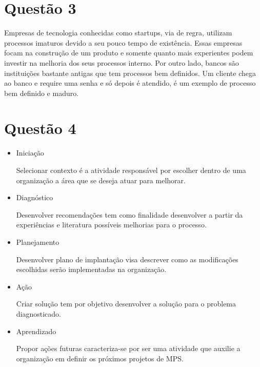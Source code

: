 \section{Questão 3}
    Empresas de tecnologia conhecidas como startups, via de regra, utilizam
processos imaturos devido a seu pouco tempo de existência. Essas empresas
focam na construção de um produto e somente quanto mais experientes podem
investir na melhoria dos seus processos interno. Por outro lado, bancos
são instituições bastante antigas que tem processos bem definidos. Um cliente
chega ao banco e require uma senha e só depois é atendido, é um exemplo de 
processo bem definido e maduro. 

\section{Questão 4}
\begin{itemize}
    \item Iniciação

    Selecionar contexto é a atividade responsável por escolher dentro de uma organização a área que se deseja atuar para melhorar.

    \item Diagnóstico

    Desenvolver recomendações tem como finalidade desenvolver a partir da experiências e literatura possíveis melhorias para o processo.

    \item Planejamento


    Desenvolver plano de implantação visa descrever como as modificações escolhidas serão implementadas na organização.

    \item Ação

    Criar solução tem por objetivo desenvolver a solução para o problema diagnosticado.

    \item Aprendizado

    Propor ações futuras caracteriza-se por ser uma atividade que auxilie a organização em definir os próximos projetos de MPS.

\end{itemize}


